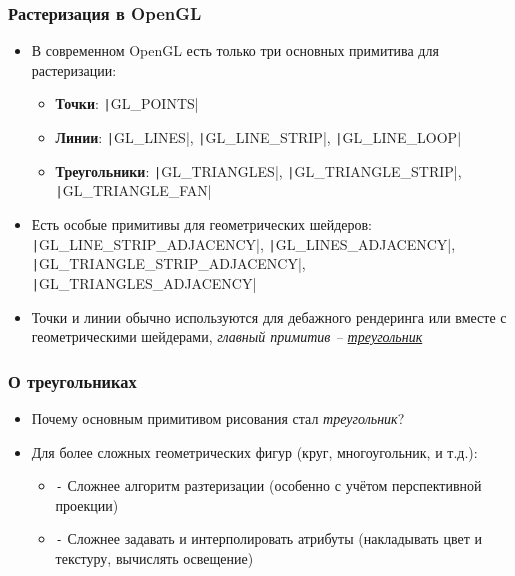 \documentclass[10pt]{beamer}
\begin{document}
\begin{frame}[fragile]
\frametitle{Растеризация в OpenGL}
\begin{itemize}
\item В современном OpenGL есть только три основных примитива для растеризации:
\pause
\begin{itemize}
\item \textbf{Точки}: \texttt|GL_POINTS|
\pause
\item \textbf{Линии}: \texttt|GL_LINES|, \texttt|GL_LINE_STRIP|, \texttt|GL_LINE_LOOP|
\pause
\item \textbf{Треугольники}: \texttt|GL_TRIANGLES|, \texttt|GL_TRIANGLE_STRIP|, \texttt|GL_TRIANGLE_FAN|
\end{itemize}
\pause
\item Есть особые примитивы для геометрических шейдеров: \texttt|GL_LINE_STRIP_ADJACENCY|, \texttt|GL_LINES_ADJACENCY|, \texttt|GL_TRIANGLE_STRIP_ADJACENCY|, \texttt|GL_TRIANGLES_ADJACENCY|
\pause
\item Точки и линии обычно используются для дебажного рендеринга или вместе с геометрическими шейдерами, \textit{главный примитив -- \underline{треугольник}}
\end{itemize}
\end{frame}

\begin{frame}
\frametitle{О треугольниках}
\begin{itemize}
\item Почему основным примитивом рисования стал \textit{треугольник}?
\pause
\item Для более сложных геометрических фигур (круг, многоугольник, и т.д.):
\pause
\begin{itemize}
\item {\color{red}\texttt{-}} Сложнее алгоритм разтеризации (особенно с учётом перспективной проекции)
\pause
\item {\color{red}\texttt{-}} Сложнее задавать и интерполировать атрибуты (накладывать цвет и текстуру, вычислять освещение)
\end{itemize}
\end{itemize}
\end{frame}
\end{document}
